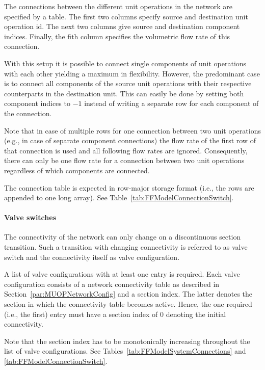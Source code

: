 The connections  between the different unit operations in the network are specified by a table.
The first two columns specify source and destination unit operation id.
The next two columns give source and destination component indices.
Finally, the fith column specifies the volumetric flow rate of this connection.

With this setup it is possible to connect single components of unit operations with each other yielding a maximum in flexibility.
However, the predominant case is to connect all components of the source unit operations with their respective counterparts in the destination unit.
This can easily be done by setting both component indices to $-1$ instead of writing a separate row for each component of the connection.

Note that in case of multiple rows for one connection between two unit operations (e.g., in case of separate component connections) the flow rate of the first row of that connection is used and all following flow rates are ignored.
Consequently, there can only be one flow rate for a connection between two unit operations regardless of which components are connected.

The connection table is expected in row-major storage format (i.e., the rows are appended to one long array).
See Table~\ref{tab:FFModelConnectionSwitch}.

\paragraph{Valve switches}
\label{par:MUOPNetworkValveSwitches}

The connectivity of the network can only change on a discontinuous section transition.
Such a transition with changing connectivity is referred to as valve switch and the connectivity itself as valve configuration. 

A list of valve configurations with at least one entry is required.
Each valve configuration consists of a network connectivity table as described in Section~\ref{par:MUOPNetworkConfig} and a section index.
The latter denotes the section in which the connectivity table becomes active.
Hence, the one required (i.e., the first) entry must have a section index of $0$ denoting the initial connectivity.

Note that the section index has to be monotonically increasing throughout the list of valve configurations.
See Tables~\ref{tab:FFModelSystemConnections} and \ref{tab:FFModelConnectionSwitch}.

